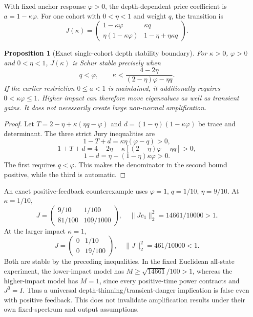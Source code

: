 \documentclass[11pt]{article}
\newtheorem{proposition}{Proposition}
\begin{document}
With fixed anchor response $\varphi>0$, the depth-dependent price coefficient is $a=1-\kappa\varphi$. For one cohort with $0<\eta<1$ and weight $q$, the transition is
\[
J(\kappa)=\begin{pmatrix}1-\kappa\varphi&\kappa q\\
\eta(1-\kappa\varphi)&1-\eta+\eta\kappa q\end{pmatrix}.
\]
\begin{proposition}[Exact single-cohort depth stability boundary]
For $\kappa>0$, $\varphi>0$ and $0<\eta<1$, $J(\kappa)$ is Schur stable precisely when
\[
q<\varphi,\qquad
\kappa<\frac{4-2\eta}{(2-\eta)\varphi-\eta q}.
\]
If the earlier restriction $0\le a<1$ is maintained, it additionally requires $0<\kappa\varphi\le1$. Higher impact can therefore move eigenvalues as well as transient gains. It does not necessarily create large non-normal amplification.
\end{proposition}
\begin{proof}
Let $T=2-\eta+\kappa(\eta q-\varphi)$ and $d=(1-\eta)(1-\kappa\varphi)$ be trace and determinant. The three strict Jury inequalities are
\[
1-T+d=\kappa\eta(\varphi-q)>0,
\]
\[
1+T+d=4-2\eta-\kappa[(2-\eta)\varphi-\eta q]>0,
\]
\[
1-d=\eta+(1-\eta)\kappa\varphi>0.
\]
The first requires $q<\varphi$. This makes the denominator in the second bound positive, while the third is automatic.
\end{proof}

An exact positive-feedback counterexample uses $\varphi=1$, $q=1/10$, $\eta=9/10$. At $\kappa=1/10$,
\[
J=\begin{pmatrix}9/10&1/100\\81/100&109/1000\end{pmatrix},
\quad \|Je_1\|_2^2=14661/10000>1.
\]
At the larger impact $\kappa=1$,
\[
J=\begin{pmatrix}0&1/10\\0&19/100\end{pmatrix},
\quad \|J\|_2^2=461/10000<1.
\]
Both are stable by the preceding inequalities. In the fixed Euclidean all-state experiment, the lower-impact model has $M\ge\sqrt{14661}/100>1$, whereas the higher-impact model has $M=1$, since every positive-time power contracts and $J^0=I$. Thus a universal depth-thinning/transient-danger implication is false even with positive feedback. This does not invalidate amplification results under their own fixed-spectrum and output assumptions.
\end{document}

